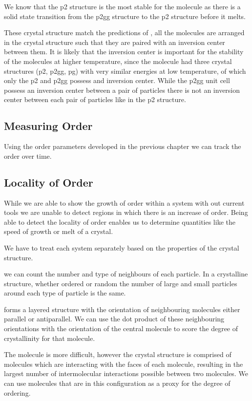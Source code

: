 We know that the p2 structure is the most stable for the \tri molecule as there is a solid state transition from the p2gg structure to the p2 structure before it melts.

These crystal structure match the predictions of \textsecref{}, all the molecules are arranged in the crystal structure such that they are paired with an inversion center between them. It is likely that the inversion center is important for the stability of the molecules at higher temperature, since the \tri molecule had three crystal structures (p2, p2gg, pg) with very similar energies at low temperature, of which only the p2 and p2gg possess and inversion center. While the p2gg unit cell possess an inversion center between a pair of particles there is not an inversion center between each pair of particles like in the p2 structure.

\subsection{Measuring Order}

Using the order parameters developed in the previous chapter we can track the order over time.

\subsection{Locality of Order}

While we are able to show the growth of order within a system with out current tools we are unable to detect regions in which there is an increase of order. Being able to detect the locality of order enables us to determine quantities like the speed of growth or melt of a crystal.

We have to treat each system separately based on the properties of the crystal structure.

\scon we can count the number and type of neighbours of each particle. In a crystalline structure, whether ordered or random the number of large and small particles around each type of particle is the same.

\sone forms a layered structure with the orientation of neighbouring molecules either parallel or antiparallel. We can use the dot product of these neighbouring orientations with the orientation of the central molecule to score the degree of crystallinity for that molecule.

The \tri molecule is more difficult, however the crystal structure is comprised of molecules which are interacting with the faces of each molecule, resulting in the largest number of intermolecular interactions possible between two molecules. We can use molecules that are in this configuration as a proxy for the degree of ordering.

